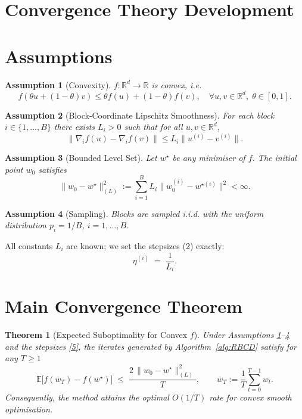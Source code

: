 \documentclass[11pt]{article}
\newtheorem{theorem}{Theorem}[section]
\newtheorem{assumption}{Assumption}[section]
\begin{document}
\section*{Convergence Theory Development}

\section{Assumptions}
\begin{assumption}[Convexity]\label{as:convex}
$f:\mathbb{R}^d\to\mathbb{R}$ is convex, i.e.
\[
f(\theta u+(1-\theta)v)\le \theta f(u)+(1-\theta)f(v),\quad\forall u,v\in\mathbb{R}^d,\;\theta\in[0,1].
\]
\end{assumption}

\begin{assumption}[Block‑Coordinate Lipschitz Smoothness]\label{as:lipschitz}
For each block $i\in\{1,\dots ,B\}$ there exists $L_i>0$ such that for all
$u,v\in\mathbb{R}^d$,
\[
\bigl\|\nabla_i f(u)-\nabla_i f(v)\bigr\|
\le L_i\bigl\|u^{(i)}-v^{(i)}\bigr\|.
\tag{3}
\]
\end{assumption}

\begin{assumption}[Bounded Level Set]\label{as:bounded}
Let $w^\star$ be any minimiser of $f$. The initial point $w_0$ satisfies
\[
\|w_0-w^\star\|_{(L)}^2:=\sum_{i=1}^B L_i\|w_0^{(i)}-w^{\star (i)}\|^2<\infty .
\tag{4}
\]
\end{assumption}

\begin{assumption}[Sampling]\label{as:sampling}
Blocks are sampled i.i.d. with the uniform distribution
$p_i=1/B$, $i=1,\dots ,B$.
\end{assumption}

All constants $L_i$ are known; we set the stepsizes (2) exactly:
\[
\eta^{(i)}\;=\;\frac{1}{L_i}.
\tag{5}
\]

\section{Main Convergence Theorem}

\begin{theorem}[Expected Suboptimality for Convex $f$]\label{thm:convex}
Under Assumptions \ref{as:convex}–\ref{as:sampling} and the stepsizes
\eqref{5}, the iterates generated by Algorithm~\ref{alg:RBCD} satisfy for any
$T\ge 1$
\[
\mathbb{E}\!\bigl[f(\bar w_T)-f(w^\star)\bigr]
\;\le\;
\frac{2\,\|w_0-w^\star\|_{(L)}^{2}}{T},
\qquad
\bar w_T:=\frac{1}{T}\sum_{t=0}^{T-1} w_t .
\tag{6}
\]
Consequently, the method attains the optimal $O(1/T)$ rate for
convex smooth optimisation.
\end{theorem}
\end{document}
